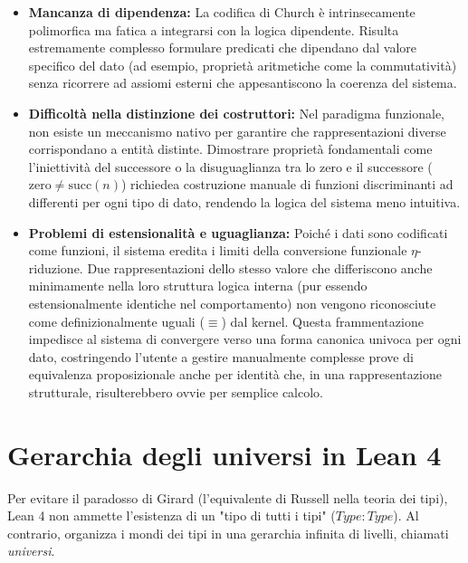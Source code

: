 \begin{itemize}
    \item 
        \textbf{Mancanza di dipendenza:} 
        La codifica di Church è intrinsecamente polimorfica ma fatica a integrarsi con la logica dipendente. Risulta estremamente complesso 
        formulare predicati che dipendano dal valore specifico del dato (ad esempio, proprietà aritmetiche come la commutatività) senza ricorrere 
        ad assiomi esterni che appesantiscono la coerenza del sistema.
    \item 
        \textbf{Difficoltà nella distinzione dei costruttori:} 
        Nel paradigma funzionale, non esiste un meccanismo nativo per garantire che rappresentazioni diverse corrispondano a entità distinte. 
        Dimostrare proprietà fondamentali come l'iniettività del successore o la disuguaglianza tra lo zero e il successore ($\text{zero} \neq 
        \text{succ}(n)$) richiedea costruzione manuale di funzioni discriminanti ad differenti per ogni tipo di dato, rendendo la logica del 
        sistema meno intuitiva.

    \item 
        \textbf{Problemi di estensionalità e uguaglianza:} 
        Poiché i dati sono codificati come funzioni, il sistema eredita i limiti della conversione funzionale $\eta$-riduzione. Due rappresentazioni 
        dello stesso valore che differiscono anche minimamente nella loro struttura logica interna (pur essendo estensionalmente identiche nel comportamento) 
        non vengono riconosciute come definizionalmente uguali ($\equiv$) dal kernel. Questa frammentazione impedisce al sistema di convergere verso una 
        forma canonica univoca per ogni dato, costringendo l'utente a gestire manualmente complesse prove di equivalenza proposizionale anche per identità 
        che, in una rappresentazione strutturale, risulterebbero ovvie per semplice calcolo.
\end{itemize}

\section{Gerarchia degli universi in Lean 4}
Per evitare il paradosso di Girard (l'equivalente di Russell nella teoria dei tipi), Lean 4 non ammette l'esistenza di un "tipo di tutti i tipi" 
($Type : Type$). Al contrario, organizza i mondi dei tipi in una gerarchia infinita di livelli, chiamati \emph{universi}.

